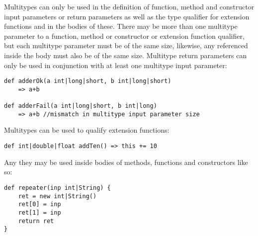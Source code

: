 \documentclass[conc-doc]{subfiles}
\begin{document}
Multitypes can only be used in the definition of function, method and constructor input parameters or return parameters as well as the type qualifier for extension functions and in the bodies of these. There may be more than one multitype parameter to a function, method or constructor or extension function qualifier, but each multitype parameter must be of the same size, likewise, any referenced inside the body must also be of the same size. Multitype return parameters can only be used in conjunction with at least one multitype input parameter:
\begin{lstlisting}
def adderOk(a int|long|short, b int|long|short)
	=> a+b
	
def adderFail(a int|long|short, b int|long)
	=> a+b //mismatch in multitype input parameter size
\end{lstlisting}

Multitypes can be used to qualify extension functions:
\begin{lstlisting}
def int|double|float addTen() => this += 10
\end{lstlisting}

Any they may be used inside bodies of methods, functions and constructors like so:
\begin{lstlisting}
def repeater(inp int|String) {
	ret = new int|String()
	ret[0] = inp 
	ret[1] = inp
	return ret
}
\end{lstlisting}
\end{document}

